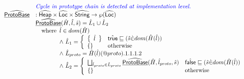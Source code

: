 \[\begin{array}{ll}
& {\color{blue} \textit{Cycle in prototype chain is detected at implementation level.}} \\
\widehat{\underline{\sf ProtoBase}} & : \widehat{\mbox{\textsf{Heap}}} \times \widehat{\mbox{\textsf{Loc}}} \times \widehat{\mbox{\textsf{String}}} \rightarrow \wp(\widehat{\mbox{\textsf{Loc}}})\\
  & \widehat{\underline{\sf ProtoBase}}(\hat{H},\hat{l},\hat{s})
    = \hat{L}_1\cup\hat{L}_2\\
  & \quad{\rm where}\begin{array}[t]{l}
      \hat{l} \in dom(\hat{H})\\
      \land\ \hat{L}_1 =
        \left\{
          \begin{array}{ll}
            \left\{\begin{array}{l}\hat{l}\end{array}\right\} & \hat{\mbox{\textsf{true}}}\sqsubseteq(\hat{s} \dot{\in} dom(\hat{H}(\hat{l}))\\
            \left\{\begin{array}{l}\end{array}\right\} & {\rm otherwise} \\
          \end{array}
        \right.\\
        \land\ \hat{L}_{proto} = \hat{H}(\hat{l})(@proto).1.1.1.2\\
      \land\ \hat{L}_2 =
        \left\{
          \begin{array}{ll}
            \bigsqcup_{\hat{l}_{proto}\in\hat{L}_{proto}}\widehat{\underline{\sf ProtoBase}}(\hat{H},\hat{l}_{proto},\hat{s})
            & \hat{\mbox{\textsf{false}}}\sqsubseteq(\hat{s} \dot{\in} dom(\hat{H}(\hat{l}))\\
            \left\{\begin{array}{l}\end{array}\right\} & {\rm otherwise} \\
          \end{array}
        \right.\\
        
      \\
    \end{array}\\
\\
\end{array}
\]
\\

